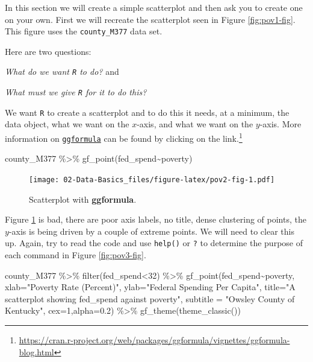 \documentclass[
]{book}
\newenvironment{Shaded}{\begin{snugshade}}{\end{snugshade}}
\newcommand{\AttributeTok}[1]{\textcolor[rgb]{0.77,0.63,0.00}{#1}}
\newcommand{\DecValTok}[1]{\textcolor[rgb]{0.00,0.00,0.81}{#1}}
\newcommand{\FloatTok}[1]{\textcolor[rgb]{0.00,0.00,0.81}{#1}}
\newcommand{\FunctionTok}[1]{\textcolor[rgb]{0.00,0.00,0.00}{#1}}
\newcommand{\NormalTok}[1]{#1}
\newcommand{\SpecialCharTok}[1]{\textcolor[rgb]{0.00,0.00,0.00}{#1}}
\newcommand{\StringTok}[1]{\textcolor[rgb]{0.31,0.60,0.02}{#1}}
\begin{document}
In this section we will create a simple scatterplot and then ask you to create one on your own. First we will recreate the scatterplot seen in Figure \ref{fig:pov1-fig}. This figure uses the \texttt{county\_M377} data set.

Here are two questions:

\emph{What do we want \texttt{R} to do?} and

\emph{What must we give \texttt{R} for it to do this?}

We want \texttt{R} to create a scatterplot and to do this it needs, at a minimum, the data object, what we want on the \(x\)-axis, and what we want on the \(y\)-axis. More information on \href{https://cran.r-project.org/web/packages/ggformula/vignettes/ggformula-blog.html}{\texttt{ggformula}} can be found by clicking on the link.\footnote{\url{https://cran.r-project.org/web/packages/ggformula/vignettes/ggformula-blog.html}}



\begin{Shaded}
\begin{Highlighting}[]
\NormalTok{county\_M377 }\SpecialCharTok{\%\textgreater{}\%}
  \FunctionTok{gf\_point}\NormalTok{(fed\_spend}\SpecialCharTok{\textasciitilde{}}\NormalTok{poverty)}
\end{Highlighting}
\end{Shaded}

\begin{figure}
\centering
\texttt{[image: 02-Data-Basics\_files/figure-latex/pov2-fig-1.pdf]}
\caption{\label{fig:pov2-fig}Scatterplot with \textbf{ggformula}.}
\end{figure}

Figure \ref{fig:pov2-fig} is bad, there are poor axis labels, no title, dense clustering of points, the \(y\)-axis is being driven by a couple of extreme points. We will need to clear this up. Again, try to read the code and use \texttt{help()} or \texttt{?} to determine the purpose of each command in Figure \ref{fig:pov3-fig}.

\begin{Shaded}
\begin{Highlighting}[]
\NormalTok{county\_M377 }\SpecialCharTok{\%\textgreater{}\%}
  \FunctionTok{filter}\NormalTok{(fed\_spend}\SpecialCharTok{\textless{}}\DecValTok{32}\NormalTok{) }\SpecialCharTok{\%\textgreater{}\%}
  \FunctionTok{gf\_point}\NormalTok{(fed\_spend}\SpecialCharTok{\textasciitilde{}}\NormalTok{poverty,}
           \AttributeTok{xlab=}\StringTok{"Poverty Rate (Percent)"}\NormalTok{, }
           \AttributeTok{ylab=}\StringTok{"Federal Spending Per Capita"}\NormalTok{,}
           \AttributeTok{title=}\StringTok{"A scatterplot showing fed\_spend against poverty"}\NormalTok{, }
           \AttributeTok{subtitle =}  \StringTok{"Owsley County of Kentucky"}\NormalTok{,}
           \AttributeTok{cex=}\DecValTok{1}\NormalTok{,}\AttributeTok{alpha=}\FloatTok{0.2}\NormalTok{) }\SpecialCharTok{\%\textgreater{}\%}
  \FunctionTok{gf\_theme}\NormalTok{(}\FunctionTok{theme\_classic}\NormalTok{())}
\end{Highlighting}
\end{Shaded}
\end{document}
